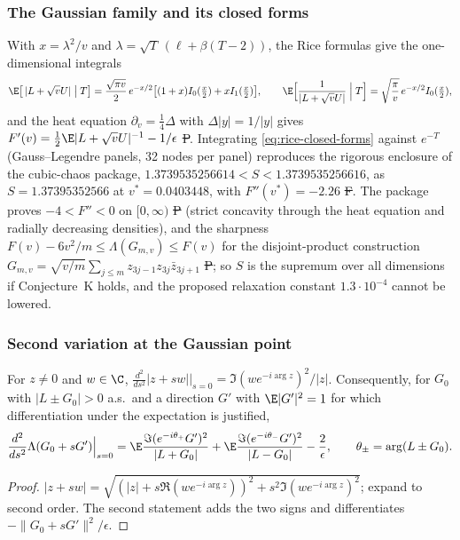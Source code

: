 \subsubsection{The Gaussian family and its closed forms}
With $x=\lambda^2/v$ and $\lambda=\sqrt T\,(\ell+\beta(T-2))$, the Rice
formulas give the one-dimensional integrals
\begin{equation}\label{eq:rice-closed-forms}
 \E\big[\,|L+\sqrt vU|\;\big|\;T\big]
 =\frac{\sqrt{\pi v}}2\,e^{-x/2}\big[(1+x)I_0(\tfrac x2)+xI_1(\tfrac x2)\big],
 \qquad
 \E\Big[\frac1{|L+\sqrt vU|}\;\Big|\;T\Big]
 =\sqrt{\frac\pi v}\,e^{-x/2}I_0(\tfrac x2),
\end{equation}
and the heat equation $\partial_v=\frac14\Delta$ with $\Delta|y|=1/|y|$
gives $F'(v)=\frac12\E|L+\sqrt vU|^{-1}-1/\epsilon$ \st{P}.
Integrating \eqref{eq:rice-closed-forms} against $e^{-T}$
(Gauss--Legendre panels, 32 nodes per panel) reproduces the rigorous
enclosure of the cubic-chaos package,
$1.3739535256614<S<1.3739535256616$, as $S=1.37395352566$ at
$v^*=0.0403448$, with $F''(v^*)=-2.26$ \st{F}. The package proves
$-4<F''<0$ on $[0,\infty)$ \st{P} (strict concavity through the heat
equation and radially decreasing densities), and the sharpness
$F(v)-6v^2/m\le\Lambda(G_{m,v})\le F(v)$ for the disjoint-product
construction $G_{m,v}=\sqrt{v/m}\sum_{j\le m}z_{3j-1}z_{3j}\bar z_{3j+1}$
\st{P}; so $S$ is the supremum over all dimensions if Conjecture~K
holds, and the proposed relaxation constant $1.3\cdot10^{-4}$ cannot be
lowered.

\subsubsection{Second variation at the Gaussian point}
\begin{lemma}
\label{lem:second-variation-modulus}
For $z\ne0$ and $w\in\C$,
$\frac{d^2}{ds^2}|z+sw|\big|_{s=0}=\Im(we^{-i\arg z})^2/|z|$.
Consequently, for $G_0$ with $|L\pm G_0|>0$ a.s.\ and a direction
$G'$ with $\E|G'|^2=1$ for which differentiation under the expectation
is justified,
\[
 \frac{d^2}{ds^2}\Lambda(G_0+sG')\Big|_{s=0}
 =\E\frac{\Im(e^{-i\theta_+}G')^2}{|L+G_0|}
 +\E\frac{\Im(e^{-i\theta_-}G')^2}{|L-G_0|}-\frac2\epsilon,
 \qquad\theta_\pm=\arg(L\pm G_0).
\]
\end{lemma}
\begin{proof}
$|z+sw|=\sqrt{(|z|+s\Re(we^{-i\arg z}))^2+s^2\Im(we^{-i\arg z})^2}$;
expand to second order. The second statement adds the two signs and
differentiates $-\|G_0+sG'\|^2/\epsilon$.
\end{proof}

